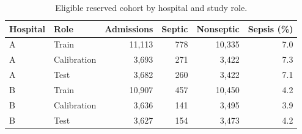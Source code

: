 \begin{table}[htbp]\centering\small
\caption{Eligible reserved cohort by hospital and study role.}\label{tab:cohort}
\begin{tabular}{llrrrr}\toprule
Hospital & Role & Admissions & Septic & Nonseptic & Sepsis (\%) \\\midrule
A & Train & 11,113 & 778 & 10,335 & 7.0 \\
A & Calibration & 3,693 & 271 & 3,422 & 7.3 \\
A & Test & 3,682 & 260 & 3,422 & 7.1 \\
B & Train & 10,907 & 457 & 10,450 & 4.2 \\
B & Calibration & 3,636 & 141 & 3,495 & 3.9 \\
B & Test & 3,627 & 154 & 3,473 & 4.2 \\
\bottomrule\end{tabular}

\end{table}
